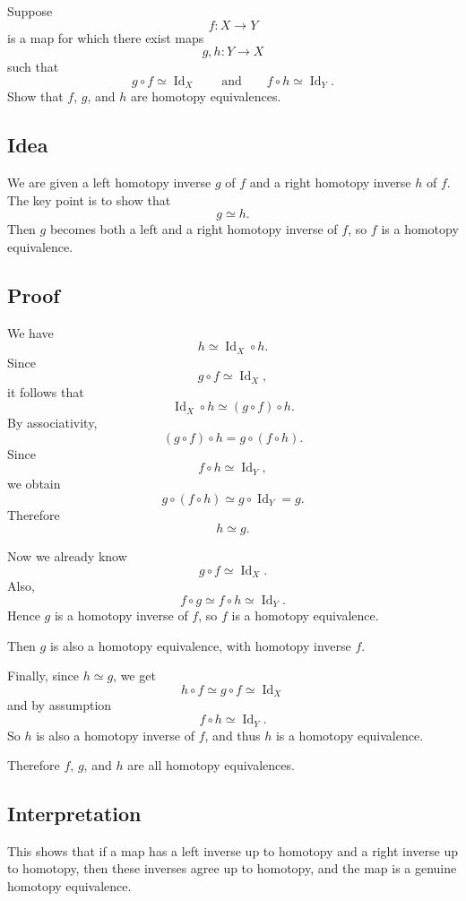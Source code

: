\documentclass[12pt,a4paper]{article}
\theoremstyle{notespace}
\begin{document}
Suppose
\[
f:X\to Y
\]
is a map for which there exist maps
\[
g,h:Y\to X
\]
such that
\[
g\circ f \simeq \operatorname{Id}_X
\qquad\text{and}\qquad
f\circ h \simeq \operatorname{Id}_Y.
\]
Show that \(f\), \(g\), and \(h\) are homotopy equivalences.

\subsection{Idea}

We are given a left homotopy inverse \(g\) of \(f\) and a right homotopy inverse \(h\) of \(f\).  
The key point is to show that
\[
g\simeq h.
\]
Then \(g\) becomes both a left and a right homotopy inverse of \(f\), so \(f\) is a homotopy equivalence.

\subsection{Proof}

We have
\[
h \simeq \operatorname{Id}_X\circ h.
\]
Since
\[
g\circ f \simeq \operatorname{Id}_X,
\]
it follows that
\[
\operatorname{Id}_X\circ h \simeq (g\circ f)\circ h.
\]
By associativity,
\[
(g\circ f)\circ h = g\circ(f\circ h).
\]
Since
\[
f\circ h \simeq \operatorname{Id}_Y,
\]
we obtain
\[
g\circ(f\circ h)\simeq g\circ\operatorname{Id}_Y = g.
\]
Therefore
\[
h\simeq g.
\]

Now we already know
\[
g\circ f \simeq \operatorname{Id}_X.
\]
Also,
\[
f\circ g \simeq f\circ h \simeq \operatorname{Id}_Y.
\]
Hence \(g\) is a homotopy inverse of \(f\), so \(f\) is a homotopy equivalence.

Then \(g\) is also a homotopy equivalence, with homotopy inverse \(f\).

Finally, since \(h\simeq g\), we get
\[
h\circ f \simeq g\circ f \simeq \operatorname{Id}_X
\]
and by assumption
\[
f\circ h \simeq \operatorname{Id}_Y.
\]
So \(h\) is also a homotopy inverse of \(f\), and thus \(h\) is a homotopy equivalence.

Therefore \(f\), \(g\), and \(h\) are all homotopy equivalences.

\subsection{Interpretation}

This shows that if a map has a left inverse up to homotopy and a right inverse up to homotopy, then these inverses agree up to homotopy, and the map is a genuine homotopy equivalence.
\end{document}
